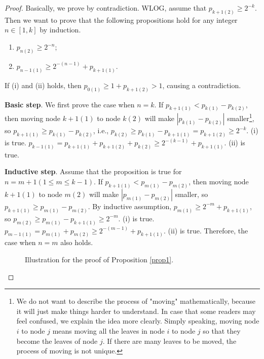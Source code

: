 \begin{proof}
Basically, we prove by contradiction. WLOG, assume that $p_{k+1(2)} \ge 2^{-k}$. Then we want to prove that the following propositions hold for any integer $n \in [1, k]$ by induction.
\begin{enumerate}[label=(\roman*)]
\item $p_{n(2)} \ge 2^{-n}$;
\item $p_{n-1(1)}\ge 2^{-(n-1)} + p_{k+1(1)}$.
\end{enumerate}
If (i) and (ii) holds, then $p_{0(1)} \ge 1 + p_{k+1(2)} > 1$, causing a contradiction.

\textbf{Basic step}. We first prove the case when $n=k$. If $p_{k+1(1)} < p_{k(1)} - p_{k(2)}$, then moving node $k+1(1)$ to node $k(2)$ will make $|p_{k(1)} - p_{k(2)}|$ smaller\footnote{We do not want to describe the process of "moving" mathematically, because it will just make things harder to understand. In case that some readers may feel confused, we explain the idea more clearly. Simply speaking, moving node $i$ to node $j$ means moving all the leaves in node $i$ to node $j$ so that they become the leaves of node $j$. If there are many leaves to be moved, the process of moving is not unique.}, so $p_{k+1(1)} \ge p_{k(1)} - p_{k(2)}$, i.e., $p_{k(2)}\ge p_{k(1)} - p_{k+1(1)} = p_{k+1(2)} \ge 2^{-k}$. (i) is true. $p_{k-1(1)} = p_{k+1(1)} + p_{k+1(2)} + p_{k(2)} \ge 2^{-(k-1)} + p_{k+1(1)}$. (ii) is true.

\textbf{Inductive step}. Assume that the proposition is true for $n=m+1(1\le m \le k-1)$. If $p_{k+1(1)} < p_{m(1)} - p_{m(2)}$, then moving node $k+1(1)$ to node $m(2)$ will make $|p_{m(1)} - p_{m(2)}|$ smaller, so $p_{k+1(1)} \ge p_{m(1)} - p_{m(2)}$. By inductive assumption, $p_{m(1)} \ge 2^{-m} + p_{k+1(1)}$, so $p_{m(2)} \ge p_{m(1)} - p_{k+1(1)} \ge 2^{-m}$. (i) is true. $p_{m-1(1)}= p_{m(1)} + p_{m(2)} \ge 2^{-(m-1)} + p_{k+1(1)}$. (ii) is true. Therefore, the case when $n=m$ also holds.

\begin{figure}[H]
    \centering
    \caption{Illustration for the proof of Proposition \ref{prop1}.}
    \label{fig:gbscProof}
\end{figure}

\end{proof}


